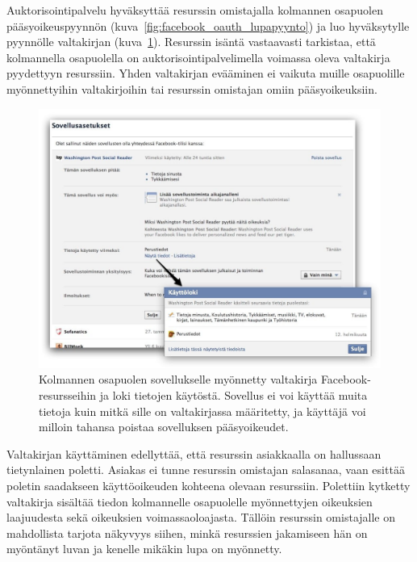 \documentclass[finnish,gradu]{tktltiki}
\begin{document}
  Auktorisointipalvelu hyväksyttää resurssin omistajalla kolmannen osapuolen pääsyoikeuspyynnön (kuva~\ref{fig:facebook_oauth_lupapyynto}) ja luo hyväksytylle pyynnölle valtakirjan (kuva~\ref{fig:facebook_app_acl}). Resurssin isäntä vastaavasti tarkistaa, että kolmannella osapuolella on auktorisointipalvelimella voimassa oleva valtakirja pyydettyyn resurssiin. Yhden valtakirjan evääminen ei vaikuta muille osapuolille myönnettyihin valtakirjoihin tai resurssin omistajan omiin pääsyoikeuksiin.

  \begin{figure}
    \centering
    \includegraphics[width=1.0\textwidth]{images/fb_app_acl.jpg}
    \caption[Valtakirja Facebook-resursseihin.]{Kolmannen osapuolen sovellukselle myönnetty valtakirja Facebook-resursseihin ja loki tietojen käytöstä. Sovellus ei voi käyttää muita tietoja kuin mitkä sille on valtakirjassa määritetty, ja käyttäjä voi milloin tahansa poistaa sovelluksen pääsyoikeudet.}
    \label{fig:facebook_app_acl}
  \end{figure}

  Valtakirjan käyttäminen edellyttää, että resurssin asiakkaalla on hallussaan tietynlainen poletti.   Asiakas ei tunne resurssin omistajan salasanaa, vaan esittää poletin saadakseen käyttöoikeuden kohteena olevaan resurssiin. Polettiin kytketty valtakirja sisältää tiedon kolmannelle osapuolelle myönnettyjen oikeuksien laajuudesta sekä oikeuksien voimassaoloajasta. Tällöin resurssin omistajalle on mahdollista tarjota näkyvyys siihen, minkä resurssien jakamiseen hän on myöntänyt luvan ja kenelle mikäkin lupa on myönnetty.
\end{document}
